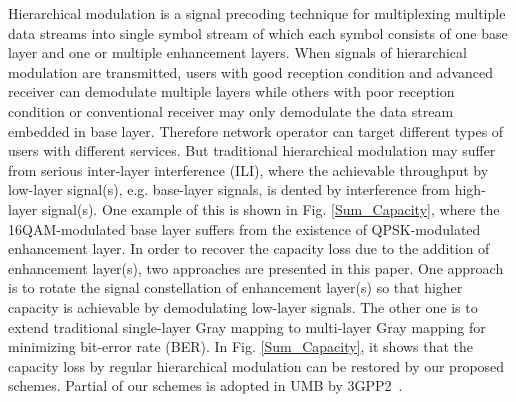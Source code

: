 \documentclass[10pt,fleqn, twocolumn]{IEEEtran}
\begin{document}
\begin{figure}
\end{figure}
Hierarchical modulation is a signal precoding technique for
multiplexing multiple data streams into single symbol stream of
which each symbol consists of one base layer and one or multiple
enhancement layers. When signals of hierarchical modulation are
transmitted, users with good reception condition and advanced
receiver can demodulate multiple layers while others with poor
reception condition or conventional receiver may only demodulate
the data stream embedded in base layer. Therefore network operator
can target different types of users with different services. But
traditional hierarchical modulation may suffer from serious
inter-layer interference (ILI), where the achievable throughput by
low-layer signal(s), e.g. base-layer signals, is dented by
interference from high-layer signal(s). One example of this is
shown in Fig. \ref{Sum_Capacity}, where the 16QAM-modulated base
layer suffers from the existence of QPSK-modulated enhancement
layer. In order to recover the capacity loss due to the addition
of enhancement layer(s), two approaches are presented in this
paper. One approach is to rotate the signal constellation of
enhancement layer(s) so that higher capacity is achievable by
demodulating low-layer signals. The other one is to extend
traditional single-layer Gray mapping to multi-layer Gray mapping
for minimizing bit-error rate (BER). In Fig. \ref{Sum_Capacity},
it shows that the capacity loss by regular hierarchical modulation
can be restored by our proposed schemes. Partial of our schemes is
adopted in UMB by 3GPP2~\cite{UMB}.
\end{document}
